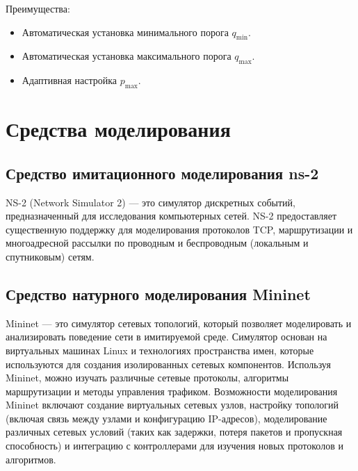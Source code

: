 Преимущества:

\begin{itemize}

\item Автоматическая установка минимального порога $q_{\min}$.

\item Автоматическая установка максимального порога $q_{\max}$.

\item Адаптивная настройка $p_{\max}$.

\end{itemize}


\section{Средства моделирования}
\label{chap1:sec3}

\subsection{Средство имитационного моделирования ns-2}
\label{chap1:sec3:sub1}

NS-2 (Network Simulator 2) --- это симулятор дискретных событий,
предназначенный для исследования компьютерных сетей. NS-2 предоставляет
существенную поддержку для моделирования протоколов TCP, маршрутизации и
многоадресной рассылки по проводным и беспроводным (локальным и спутниковым)
сетям.

\subsection{Средство натурного моделирования Mininet}
\label{chap1:sec3:sub2}

Mininet --- это симулятор сетевых топологий, который позволяет моделировать и
анализировать поведение сети в имитируемой среде. Симулятор основан на
виртуальных машинах Linux и технологиях пространства имен, которые используются
для создания изолированных сетевых компонентов. Используя Mininet, можно
изучать различные сетевые протоколы, алгоритмы маршрутизации и методы
управления трафиком. Возможности моделирования Mininet включают создание
виртуальных сетевых узлов, настройку топологий (включая связь между узлами и
конфигурацию IP-адресов), моделирование различных сетевых условий (таких как
задержки, потеря пакетов и пропускная способность) и интеграцию с контроллерами
для изучения новых протоколов и алгоритмов.

